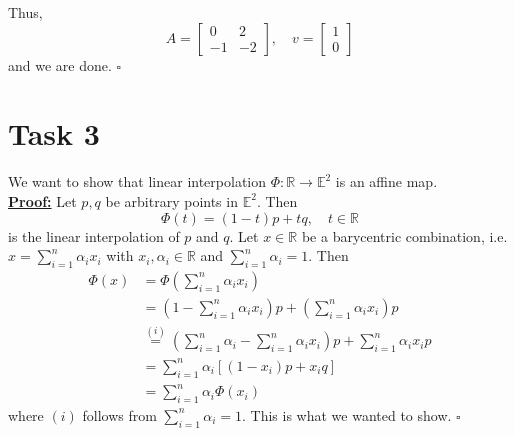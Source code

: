 \documentclass[]{article}
\begin{document}
Thus, \begin{equation*}
A=\left[\begin{array}{cc}
0&2\\
-1&-2
\end{array}\right], \quad v=\left[\begin{array}{c}
1\\
0
\end{array}\right]
\end{equation*}
and we are done. $\square$
\section*{Task 3}
We want to show that linear interpolation $\Phi : \mathbb{R} \rightarrow \mathbb{E}^2$ is an affine map.\\
\underline{\textbf{Proof:}} Let $p,q$ be arbitrary points in $\mathbb{E}^2$. Then \begin{equation*}
\Phi (t) = (1-t)p + tq, \quad t\in \mathbb{R}
\end{equation*}
is the linear interpolation of $p$ and $q$. Let $x\in \mathbb{R}$ be a barycentric combination, i.e. $x=\sum_{i=1}^{n}\alpha_i x_i$ with $x_i, \alpha_i\in \mathbb{R}$ and $\sum_{i=1}^{n}\alpha_i = 1$. Then \begin{equation*}
\begin{aligned}
\Phi (x) &= \Phi (\sum_{i=1}^{n}\alpha_i x_i)\\
&=(1-\sum_{i=1}^{n}\alpha_i x_i)p + (\sum_{i=1}^{n}\alpha_i x_i)p\\
&\overset{(i)}{=}(\sum_{i=1}^{n}\alpha_i-\sum_{i=1}^{n}\alpha_i x_i)p + \sum_{i=1}^{n}\alpha_i x_ip\\
&=\sum_{i=1}^{n}\alpha_i[(1-x_i)p + x_iq]\\
&=\sum_{i=1}^{n}\alpha_i\Phi(x_i)
\end{aligned}
\end{equation*}
where $(i)$ follows from $\sum_{i=1}^{n}\alpha_i=1$. This is what we wanted to show. $\square$
\end{document}
